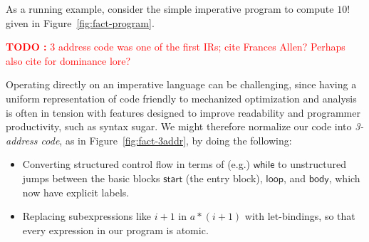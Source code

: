 \documentclass[acmsmall,screen,review]{acmart}
\newcounter{todos}
\newcommand{\TODO}[1]{{
  \stepcounter{todos}
  \begin{center}\large{\textcolor{red}{\textbf{TODO \arabic{todos}:} #1}}\end{center}
}}
\newcommand{\ms}[1]{\ensuremath{\mathsf{#1}}}
\begin{document}
As a running example, consider the simple imperative program to compute $10!$ given in
Figure~\ref{fig:fact-program}. 

\TODO{3 address code was one of the first IRs; cite Frances Allen? Perhaps also cite
\cite{allen-70-cfa} for dominance lore?}

Operating directly on an imperative language can be challenging, since having a uniform
representation of code friendly to mechanized optimization and analysis is often in tension with
features designed to improve readability and programmer productivity, such as syntax sugar. We might
therefore normalize our code into \textit{3-address code}, as in Figure~\ref{fig:fact-3addr}, by
doing the following:
\begin{itemize}
  \item Converting structured control flow in terms of (e.g.) \ms{while} to unstructured jumps
  between the basic blocks \ms{start} (the entry block), \ms{loop}, and \ms{body}, which now have
  explicit labels. 
  \item Replacing subexpressions like $i + 1$ in $a * (i + 1)$ with let-bindings, so that every
  expression in our program is atomic. 
\end{itemize}
\end{document}
